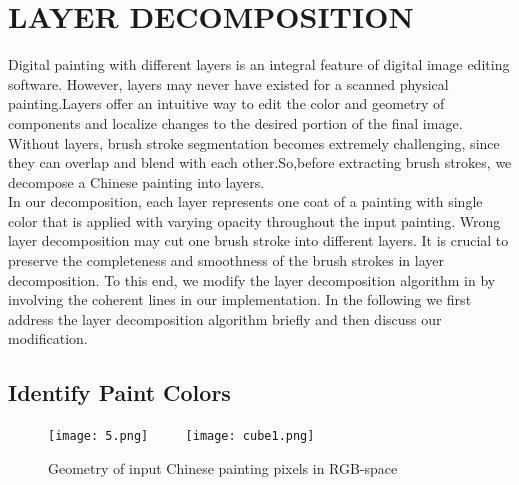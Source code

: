 \chapter{LAYER DECOMPOSITION}
Digital painting with different layers is an integral feature of digital image editing software. However, layers may never have existed for a scanned physical painting.Layers offer an intuitive way to edit the color and geometry of components and localize changes to the desired portion of the final image. Without layers, brush stroke segmentation becomes extremely challenging, since they can overlap and blend with each other.So,before extracting brush strokes, we decompose a Chinese painting into layers.\\
In our decomposition, each layer represents one coat of a painting with single color that is applied with varying opacity throughout the input painting. Wrong layer decomposition may cut one brush stroke into different layers. It is crucial to preserve the completeness and smoothness of the brush strokes in layer decomposition. To this end, we modify the layer decomposition algorithm in \cite{tan2016decomposing} by involving the coherent lines \cite{kang2007coherent} in our implementation. In the following we first address the layer decomposition algorithm \cite{tan2016decomposing} briefly and then discuss our modification. 


\section{Identify Paint Colors}

\begin{figure}[H]
	\centering
	\texttt{[image: 5.png]}
	~~~~
	\texttt{[image: cube1.png]}
	\caption{Geometry of input Chinese painting pixels in RGB-space}
	\label{point cloud}
\end{figure}

